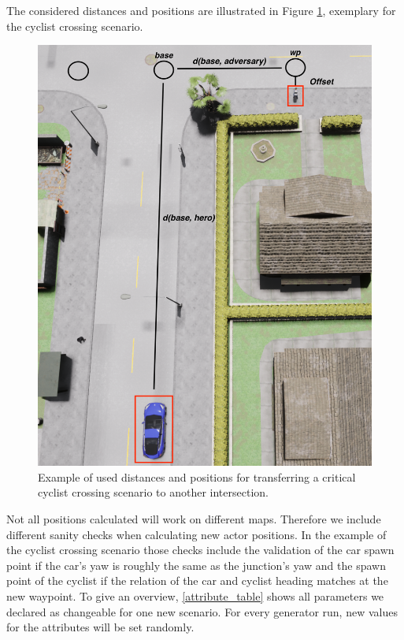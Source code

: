 \documentclass[conference, a4paper, 11pt]{IEEEtran}
\begin{document}
The considered distances and positions are illustrated  in Figure \ref{fig:distances_carla}, exemplary for the cyclist crossing scenario.

\begin{figure}[ht]
	\centering
	\includegraphics[width=\linewidth]{figures/carla_distances.png}
	\caption{Example of used distances and positions for transferring a critical cyclist crossing scenario to another intersection. }
	\label{fig:distances_carla}
\end{figure}

Not all positions calculated will work on different maps. Therefore we include different sanity checks when calculating new actor positions. In the example of the cyclist crossing scenario those checks include the validation of the car spawn point if the car's yaw is roughly the same as the junction's yaw and the spawn point of the cyclist  if the relation of the car and cyclist heading matches at the new waypoint.
To give an overview, \autoref{attribute_table} shows all parameters we declared as changeable for one new scenario. For every generator run, new values for the attributes will be set randomly.
\end{document}
